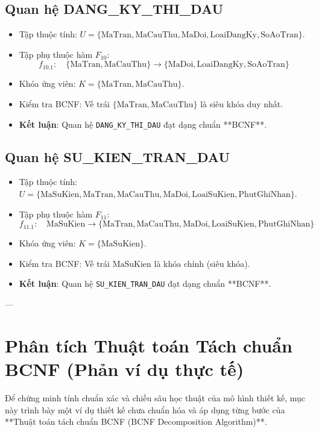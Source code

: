 \subsection{Quan hệ DANG\_KY\_THI\_DAU}
\begin{itemize}
    \item Tập thuộc tính: $U = \{\text{MaTran}, \text{MaCauThu}, \text{MaDoi}, \text{LoaiDangKy}, \text{SoAoTran}\}$.
    \item Tập phụ thuộc hàm $F_{10}$:
    $$f_{10.1}: \quad \{\text{MaTran}, \text{MaCauThu}\} \rightarrow \{\text{MaDoi}, \text{LoaiDangKy}, \text{SoAoTran}\}$$
    \item Khóa ứng viên: $K = \{\text{MaTran}, \text{MaCauThu}\}$.
    \item Kiểm tra BCNF: Vế trái $\{\text{MaTran}, \text{MaCauThu}\}$ là siêu khóa duy nhất.
    \item \textbf{Kết luận}: Quan hệ \texttt{DANG\_KY\_THI\_DAU} đạt dạng chuẩn **BCNF**.
\end{itemize}

\subsection{Quan hệ SU\_KIEN\_TRAN\_DAU}
\begin{itemize}
    \item Tập thuộc tính: $U = \{\text{MaSuKien}, \text{MaTran}, \text{MaCauThu}, \text{MaDoi}, \text{LoaiSuKien}, \text{PhutGhiNhan}\}$.
    \item Tập phụ thuộc hàm $F_{11}$:
    $$f_{11.1}: \quad \text{MaSuKien} \rightarrow \{\text{MaTran}, \text{MaCauThu}, \text{MaDoi}, \text{LoaiSuKien}, \text{PhutGhiNhan}\}$$
    \item Khóa ứng viên: $K = \{\text{MaSuKien}\}$.
    \item Kiểm tra BCNF: Vế trái $\text{MaSuKien}$ là khóa chính (siêu khóa).
    \item \textbf{Kết luận}: Quan hệ \texttt{SU\_KIEN\_TRAN\_DAU} đạt dạng chuẩn **BCNF**.
\end{itemize}

---

\section{Phân tích Thuật toán Tách chuẩn BCNF (Phản ví dụ thực tế)}

Để chứng minh tính chuẩn xác và chiều sâu học thuật của mô hình thiết kế, mục này trình bày một ví dụ thiết kế chưa chuẩn hóa và áp dụng từng bước của **Thuật toán tách chuẩn BCNF (BCNF Decomposition Algorithm)**.


